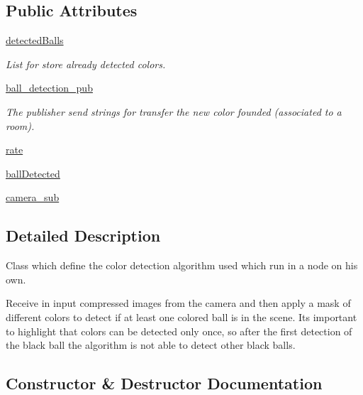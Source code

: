 \subsection*{Public Attributes}
\begin{DoxyCompactItemize}
\item 
\hyperlink{classballDetection_1_1ballDetector_ae7c6db80d37aa2d3f22b0ea9331823d2}{detected\+Balls}
\begin{DoxyCompactList}\small\item\em List for store already detected colors. \end{DoxyCompactList}\item 
\hyperlink{classballDetection_1_1ballDetector_ab09c82e74e052ab38cbfb5ae32c281ac}{ball\+\_\+detection\+\_\+pub}
\begin{DoxyCompactList}\small\item\em The publisher send strings for transfer the new color founded (associated to a room). \end{DoxyCompactList}\item 
\hyperlink{classballDetection_1_1ballDetector_a2078441c3a3cc044e914c90656a9a5e0}{rate}
\item 
\hyperlink{classballDetection_1_1ballDetector_a7e34212f61e96cbdfabe9db9b7c95e16}{ball\+Detected}
\item 
\hyperlink{classballDetection_1_1ballDetector_a80579e1cc221f9c74eafb6cf5a24e132}{camera\+\_\+sub}
\end{DoxyCompactItemize}


\subsection{Detailed Description}
Class which define the color detection algorithm used which run in a node on his own. 

Receive in input compressed images from the camera and then apply a mask of different colors to detect if at least one colored ball is in the scene. It\textquotesingle{}s important to highlight that colors can be detected only once, so after the first detection of the black ball the algorithm is not able to detect other black balls. 

\subsection{Constructor \& Destructor Documentation}
